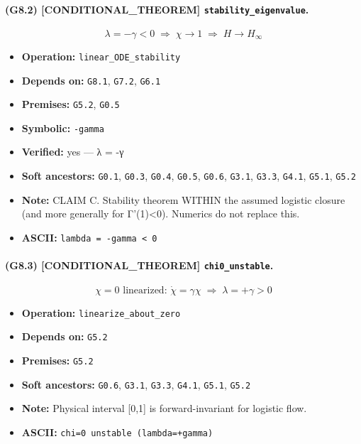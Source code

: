 \documentclass[11pt,a4paper]{article}
\theoremstyle{remark}\newtheorem*{caution}{Caution}
\newcommand{\tagbox}[1]{\textsc{[#1]}}
\begin{document}
\paragraph{(G8.2) \tagbox{CONDITIONAL\_THEOREM} \texttt{stability\_eigenvalue}.}
\begin{equation}
\lambda=-\gamma<0\;\Rightarrow\;\chi\to 1\;\Rightarrow\;H\to H_\infty
\tag{G8.2}
\end{equation}
\begin{itemize}\setlength{\itemsep}{0.12em}
\item \textbf{Operation:} \texttt{linear\_ODE\_stability}
\item \textbf{Depends on:} \texttt{G8.1}, \texttt{G7.2}, \texttt{G6.1}
\item \textbf{Premises:} \texttt{G5.2}, \texttt{G0.5}
\item \textbf{Symbolic:} \texttt{-gamma}
\item \textbf{Verified:} yes --- λ = -γ
\item \textbf{Soft ancestors:} \texttt{G0.1}, \texttt{G0.3}, \texttt{G0.4}, \texttt{G0.5}, \texttt{G0.6}, \texttt{G3.1}, \texttt{G3.3}, \texttt{G4.1}, \texttt{G5.1}, \texttt{G5.2}
\item \textbf{Note:} CLAIM C. Stability theorem WITHIN the assumed logistic closure (and more generally for Γ'(1)<0). Numerics do not replace this.
\item \textbf{ASCII:} \texttt{lambda = -gamma < 0}
\end{itemize}
\paragraph{(G8.3) \tagbox{CONDITIONAL\_THEOREM} \texttt{chi0\_unstable}.}
\begin{equation}
\chi=0\text{ linearized: }\dot\chi=\gamma\chi\;\Rightarrow\;\lambda=+\gamma>0
\tag{G8.3}
\end{equation}
\begin{itemize}\setlength{\itemsep}{0.12em}
\item \textbf{Operation:} \texttt{linearize\_about\_zero}
\item \textbf{Depends on:} \texttt{G5.2}
\item \textbf{Premises:} \texttt{G5.2}
\item \textbf{Soft ancestors:} \texttt{G0.6}, \texttt{G3.1}, \texttt{G3.3}, \texttt{G4.1}, \texttt{G5.1}, \texttt{G5.2}
\item \textbf{Note:} Physical interval [0,1] is forward-invariant for logistic flow.
\item \textbf{ASCII:} \texttt{chi=0 unstable (lambda=+gamma)}
\end{itemize}
\end{document}
